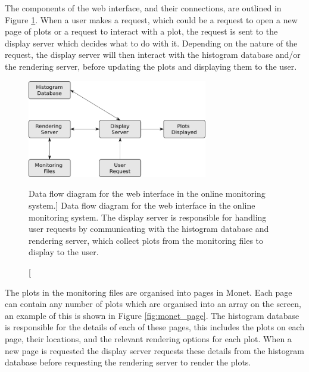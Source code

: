 The components of the web interface, and their connections, are outlined in 
Figure \ref{fig:monet_flow}. When a user makes a request, which could be a
request to open a new page of plots or a request to interact with a plot, the 
request is sent to the display server which decides what to do with it.
Depending on the nature of the request, the display server will then interact
with the histogram database and/or the rendering server, before updating the
plots and displaying them to the user. 

\begin{figure}

	\centering

	\includegraphics[width=0.7\textwidth]{figures/monet_flow.png}

	\caption
	[Data flow diagram for the web interface in the \protodune{} online 
	monitoring system.] 
	{Data flow diagram for the web interface in the \protodune{} online 
	monitoring system. The display server is responsible for handling user
	requests by communicating with the histogram database and rendering server,
	which collect plots from the monitoring files to display to the user.} 
	\label{fig:monet_flow}

\end{figure}

The plots in the monitoring files are organised into pages in Monet. Each page
can contain any number of plots which are organised into an array on the screen,
an example of this is shown in Figure \ref{fig:monet_page}. The histogram 
database is responsible for the details of each of these pages, this includes
the plots on each page, their locations, and the relevant rendering options for
each plot. When a new page is requested the display server requests these
details from the histogram database before requesting the rendering server to 
render the plots.

